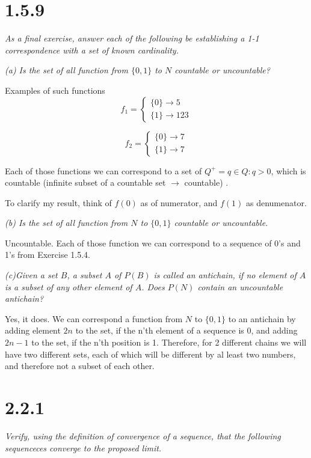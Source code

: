 \documentclass[11pt,oneside,titlepage]{article}
\begin{document}
\section*{1.5.9}
\textit{As a final exercise, answer each of the following be establishing a 1-1
  correspondence with a set of known cardinality.}

\textit{(a) Is the set of all function from $\{0, 1\}$ to $N$ countable or
  uncountable?}

Examples of such functions
\begin{equation}
  f_1 =
  \begin{cases}
    \{0\} \to 5 \\
    \{1\} \to 123
  \end{cases}
\end{equation}

\begin{equation}
  f_2 =
  \begin{cases}
    \{0\} \to 7 \\
    \{1\} \to 7
  \end{cases}
\end{equation}

Each of those functions we can correspond to a set of $Q^+ = {q \in Q: q > 0}$,
which is countable (infinite subset of a countable set $\to$ countable) .

To clarify my result, think of $f(0)$ as of numerator, and $f(1)$ as denumenator.

\textit{(b) Is the set of all function from $N$ to $\{0, 1\}$ countable or uncountable.}

Uncountable. Each of those function we can correspond to a sequence of 0's and 1's from
Exercise 1.5.4.

\textit{(c)Given a set $B$, a subset $A$ of $P(B)$ is called an antichain, if no
  element of $A$ is a subset of any other element of $A$. Does $P(N)$ contain an
  uncountable antichain?}

Yes, it does. We can correspond a function from $N$ to $\{0, 1\}$ to an antichain
by adding element $2n$ to the set, if the n'th element of a sequence is 0, and
adding $2n - 1$ to the set, if the n'th position is 1. Therefore, for
2 different chains we will have two different sets, each of which will be
different by al least two numbers, and therefore not a subset of each other.

\section*{2.2.1}
\textit{Verify, using the definition of convergence of a sequence, that the following
  sequenceces converge to the proposed limit.}
\end{document}
